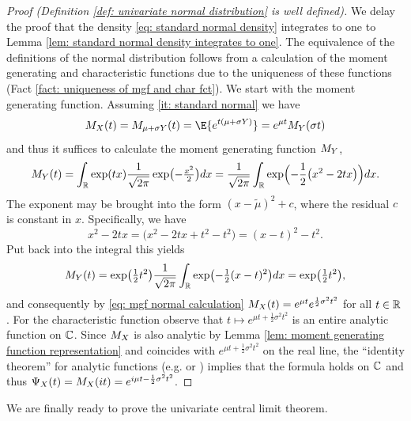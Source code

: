 \begin{proof}[Proof (Definition \ref{def: univariate normal distribution} is well defined)]
    We delay the proof that the density \eqref{eq: standard normal density} integrates to one
    to Lemma \ref{lem: standard normal density integrates to one}. The equivalence of the definitions of the
    normal distribution follows from a calculation of the moment generating and
    characteristic functions due to the uniqueness of these functions (Fact
    \ref{fact: uniqueness of mgf and char fct}). We start with the moment
    generating function. Assuming \ref{it: standard
    normal} we have
    \begin{equation}
        \label{eq: mgf normal calculation}    
        \MGF_X(t) = \MGF_{\mu + \sigma Y}(t) = \E{e^{t(\mu + \sigma Y)}} = e^{\mu t}\MGF_Y(\sigma t)
    \end{equation}
    and thus it suffices to calculate the moment generating function \(M_Y\),
    \[
        M_Y(t)
        = \int_{\mathbb{R}} \exp(tx) \frac1{\sqrt{2\pi}}
        \exp\bigl(-\tfrac{x^2}{2}\bigr) dx
        = \frac1{\sqrt{2\pi}} \int_{\mathbb{R}}
        \exp\Bigl(-\frac1{2}\bigl(x^2 - 2 tx\bigr)\Bigr) dx.
    \]
    The exponent may be brought into the form \((x-\tilde{\mu})^2 +
    c\), where the residual \(c\) is constant in \(x\).
    Specifically, we have
    \[
        x^2 - 2 tx
        = \bigl(x^2 - 2 t x + t^2 - t^2\bigr)
        = (x - t)^2 - t^2.
    \]
    Put back into the integral this yields
    \[
        M_Y(t)
        = \exp\bigl(\tfrac12 t^2\bigr)
        \frac1{\sqrt{2\pi}} \int_{\mathbb{R}}
        \exp\bigl(-\tfrac1{2}(x - t)^2\bigr) dx
        = \exp\bigl(\tfrac12 t^2\bigr),
    \]
    and consequently by \eqref{eq: mgf normal calculation} \(M_X(t) = e^{\mu t} e^{\frac12 \sigma^2 t^2}\)
    for all \(t\in \mathbb{R}\). For the characteristic function observe that
    \(t\mapsto e^{\mu t + \frac12 \sigma^2 t^2}\) is an entire analytic function
    on \(\mathbb{C}\).  Since \(M_X\) is also analytic by Lemma \ref{lem:
    moment generating function representation} and coincides with \(e^{\mu t +
    \frac12 \sigma^2 t^2}\) on the real line, the ``identity theorem'' for
    analytic functions (e.g. \citep[Satz 12, Section
    3.5]{janichFunktionentheorie2004} or \citep[Corollary
    1.2.7]{krantzPrimerRealAnalytic2002}) implies that the formula holds on \(\mathbb{C}\) and thus
    \(\Psi_X(t) = M_X(it) = e^{i \mu t - \frac12 \sigma^2 t^2}\).
\end{proof}

We are finally ready to prove the univariate central limit theorem.

